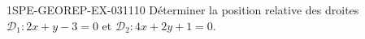 \begin{exercice}{1SPE-GEOREP-EX-031}{1}{10}
Déterminer la position relative des droites $\mathcal{D}_1 : 2x + y - 3 = 0$ et $\mathcal{D}_2 : 4x + 2y + 1 = 0$.
\end{exercice}
